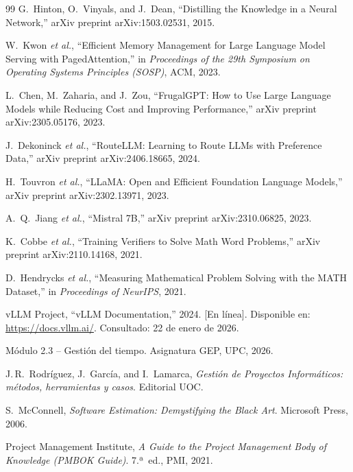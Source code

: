 \documentclass[11pt,a4paper]{article}
\begin{document}
\begin{thebibliography}{99}
G.~Hinton, O.~Vinyals, and J.~Dean, ``Distilling the Knowledge in a Neural Network,'' arXiv preprint arXiv:1503.02531, 2015.

W.~Kwon \textit{et al.}, ``Efficient Memory Management for Large Language Model Serving with PagedAttention,'' in \textit{Proceedings of the 29th Symposium on Operating Systems Principles (SOSP)}, ACM, 2023.

L.~Chen, M.~Zaharia, and J.~Zou, ``FrugalGPT: How to Use Large Language Models while Reducing Cost and Improving Performance,'' arXiv preprint arXiv:2305.05176, 2023.

J.~Dekoninck \textit{et al.}, ``RouteLLM: Learning to Route LLMs with Preference Data,'' arXiv preprint arXiv:2406.18665, 2024.

H.~Touvron \textit{et al.}, ``LLaMA: Open and Efficient Foundation Language Models,'' arXiv preprint arXiv:2302.13971, 2023.

A.~Q.~Jiang \textit{et al.}, ``Mistral 7B,'' arXiv preprint arXiv:2310.06825, 2023.

K.~Cobbe \textit{et al.}, ``Training Verifiers to Solve Math Word Problems,'' arXiv preprint arXiv:2110.14168, 2021.

D.~Hendrycks \textit{et al.}, ``Measuring Mathematical Problem Solving with the MATH Dataset,'' in \textit{Proceedings of NeurIPS}, 2021.

vLLM Project, ``vLLM Documentation,'' 2024. [En línea]. Disponible en: \url{https://docs.vllm.ai/}. Consultado: 22 de enero de 2026.

Módulo 2.3 -- Gestión del tiempo. Asignatura GEP, UPC, 2026.

J.\,R.~Rodríguez, J.~García, and I.~Lamarca, \textit{Gestión de Proyectos Informáticos: métodos, herramientas y casos}. Editorial UOC.

S.~McConnell, \textit{Software Estimation: Demystifying the Black Art}. Microsoft Press, 2006.

Project Management Institute, \textit{A Guide to the Project Management Body of Knowledge (PMBOK Guide)}. 7.ª~ed., PMI, 2021.


\end{thebibliography}
\end{document}
